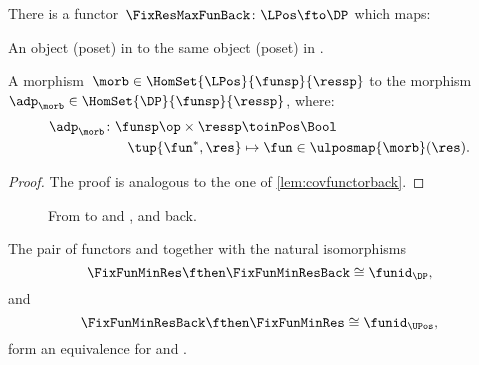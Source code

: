 \begin{lemma}
    \label{lem:cofunctorback}
    There is a functor~$\FixResMaxFunBack\colon \LPos \fto \DP$ which maps:
    \begin{compactenum}
        \item An object (poset) in \UPos to the same object (poset) in \DP.
        \item A morphism~$\morb\in \HomSet{\LPos}{\funsp}{\ressp}$ to the morphism~$\adp_\morb \in \HomSet{\DP}{\funsp}{\ressp}$, where:
        \begin{equation}
            \begin{aligned}
                \adp_\morb\colon \funsp\op \times \ressp &\toinPos \Bool\\
                \tup{\fun^*,\res}&\mapsto \fun \in \ulposmap{\morb}(\res).
            \end{aligned}
        \end{equation}
    \end{compactenum}
\end{lemma}

\begin{proof}
    The proof is analogous to the one of \cref{lem:covfunctorback}.
\end{proof}


\begin{figure}[tbh]
    \centering
    \caption{From \DP to \UPos and \LPos, and back.}
\end{figure}



\begin{lemma}
    The pair of functors \FixFunMinRes and \FixFunMinResBack together with the natural isomorphisms
    \begin{equation*}
        \FixFunMinRes \fthen \FixFunMinResBack \cong \funid_\DP,
    \end{equation*}
    and
    \begin{equation*}
        \FixFunMinResBack \fthen \FixFunMinRes \cong \funid_\UPos,
    \end{equation*}
    form an equivalence for \DP and \UPos.
\end{lemma}

